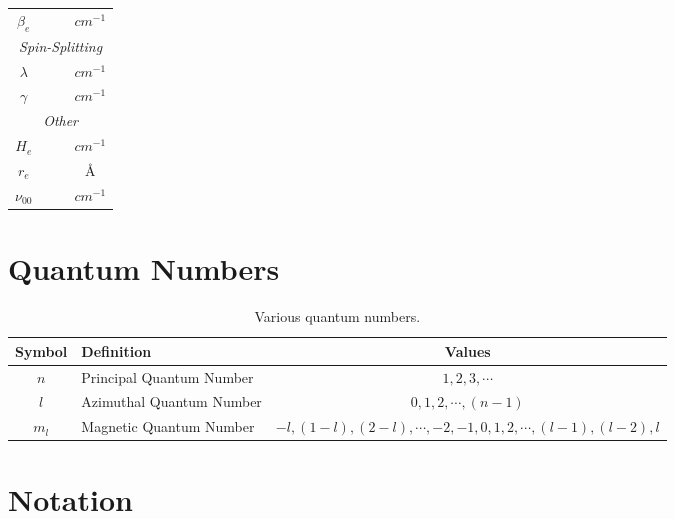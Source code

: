 \documentclass[11pt, twoside, fleqn]{report}
\DeclareRobustCommand\_{\ifmmode\expandafter\subtxt\else\textunderscore\fi}
\begin{document}
\begin{table}[H]
\begin{tabular}{cccc}
        $\beta_e$     &                           &                         & $\unit{cm^{-1}}$ \\
        \multicolumn{4}{c}{\textit{Spin-Splitting}}                                            \\
        \cmidrule(lr){1-4}
        $\lambda$     &                           &                         & $\unit{cm^{-1}}$ \\
        $\gamma$      &                           &                         & $\unit{cm^{-1}}$ \\
        \multicolumn{4}{c}{\textit{Other}}                                                     \\
        \cmidrule(lr){1-4}
        $H_e$         &                           &                         & $\unit{cm^{-1}}$ \\
        $r_e$         &                           &                         & \AA              \\
        $\nu_{00}$    &                           &                         & $\unit{cm^{-1}}$ \\
        \bottomrule
    \end{tabular}
\end{table}

\chapter{Quantum Numbers}
\label{a:quantum_numbers}

\begin{table}[H]
    \centering
    \caption{Various quantum numbers.}
    \label{t:quantum_numbers}
    \begin{tabular}{clc}
        \toprule
        Symbol & Definition & Values \\
        \midrule
        $n$ & Principal Quantum Number & $1, 2, 3, \dotsb$ \\
        $l$ & Azimuthal Quantum Number & $0, 1, 2, \dotsb, (n - 1)$ \\
        $m_l$ & Magnetic Quantum Number & $-l, (1 - l), (2 - l), \dotsb, -2, -1, 0, 1, 2, \dotsb, (l - 1), (l - 2), l$ \\
        \bottomrule
    \end{tabular}
\end{table}

\chapter{Notation}
\label{a:notation}
\end{document}
